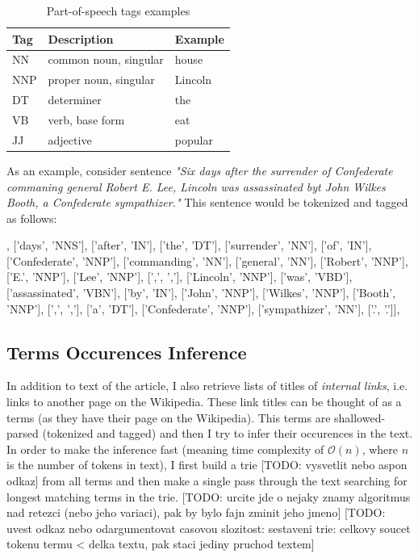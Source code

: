 \documentclass[a4paper, 12pt, twoside]{fithesis2}		%
\renewcommand{\_}{\leavevmode \kern0.0em\vbox{\hrule width0.4em}}
\begin{document}
\begin{table}[h]
\begin{center}
\begin{tabular}{| l | l | l |}
  \hline
  Tag & Description & Example \\
  \hline \hline
  NN & common noun, singular & house         \\ \hline
  NNP & proper noun, singular & Lincoln     \\ \hline
  DT & determiner & the \\ \hline
  VB & verb, base form & eat \\ \hline
  JJ & adjective & popular \\ \hline
\end{tabular}
\end{center}
\caption{Part-of-speech tags examples \cite{penn-tagset} }
\end{table}

As an example, consider sentence \textit{"Six days after the surrender of Confederate commaning general Robert E. Lee, Lincoln was assassinated byt John Wilkes Booth, a Confederate sympathizer."} This sentence would be tokenized and tagged as follows:
\begin{code}
[['Six', 'CD'], ['days', 'NNS'], ['after', 'IN'], ['the', 'DT'],
['surrender', 'NN'], ['of', 'IN'], ['Confederate', 'NNP'],
['commanding', 'NN'], ['general', 'NN'], ['Robert', 'NNP'],
['E.', 'NNP'], ['Lee', 'NNP'], [',', ','], ['Lincoln', 'NNP'],
['was', 'VBD'], ['assassinated', 'VBN'], ['by', 'IN'],
['John', 'NNP'], ['Wilkes', 'NNP'], ['Booth', 'NNP'],
[',', ','], ['a', 'DT'], ['Confederate', 'NNP'],
['sympathizer', 'NN'], ['.', '.']],
\end{code}

\subsection*{Terms Occurences Inference}
In addition to text of the article, I also retrieve lists of titles of \textit{internal links}, i.e. links to another page on the Wikipedia.
These link titles can be thought of as a terms (as they have their page on the Wikipedia).
This terms are shallowed-parsed (tokenized and tagged)
and then I try to infer their occurences in the text.
In order to make the inference fast (meaning time complexity of $\mathcal{O}(n)$, where $n$ is the number of tokens in text), I first build a trie [TODO: vysvetlit nebo aspon odkaz] from all terms and then make a single pass through the text searching for longest matching terms in the trie. [TODO: urcite jde o nejaky znamy algoritmus nad retezci (nebo jeho variaci), pak by bylo fajn zminit jeho jmeno]
[TODO: uvest odkaz nebo odargumentovat casovou slozitost: sestaveni trie: celkovy soucet tokenu termu < delka textu, pak staci jediny pruchod textem]
\end{document}

